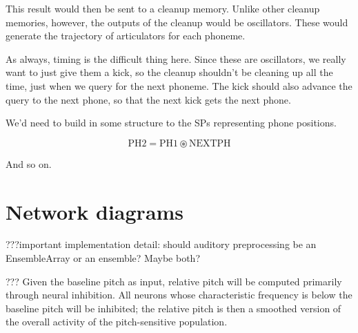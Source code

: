 This result would then be sent to a cleanup memory.
Unlike other cleanup memories, however,
the outputs of the cleanup would be oscillators.
These would generate the trajectory of articulators
for each phoneme.

As always, timing is the difficult thing here.
Since these are oscillators, we really want to
just give them a kick, so the cleanup shouldn't
be cleaning up all the time, just when
we query for the next phoneme.
The kick should also advance the query
to the next phone,
so that the next kick gets the next phone.

We'd need to build in some structure to the SPs
representing phone positions.

$$\text{PH2} = \text{PH1} \circledast \text{NEXTPH}$$

And so on.

\section{Network diagrams}

???important implementation detail:
should auditory preprocessing be an EnsembleArray
or an ensemble? Maybe both?

??? Given the baseline pitch as input,
relative pitch will be computed
primarily through neural inhibition.
All neurons whose characteristic frequency is below
the baseline pitch will be inhibited;
the relative pitch is then
a smoothed version of the overall activity
of the pitch-sensitive population.
